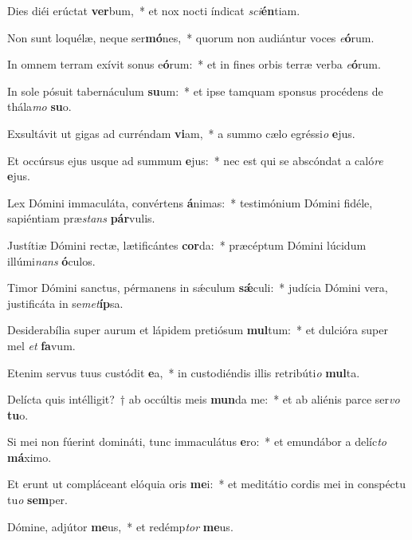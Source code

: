 \item Dies diéi erúctat \textbf{ver}bum,~* et nox nocti índicat \textit{sci}\textbf{én}tiam.
\item Non sunt loquélæ, neque ser\textbf{mó}nes,~* quorum non audiántur voces \textit{e}\textbf{ó}rum.
\item In omnem terram exívit sonus e\textbf{ó}rum:~* et in fines orbis terræ verba \textit{e}\textbf{ó}rum.
\item In sole pósuit tabernáculum \textbf{su}um:~* et ipse tamquam sponsus procédens de thála\textit{mo} \textbf{su}o.
\item Exsultávit ut gigas ad curréndam \textbf{vi}am,~* a summo cælo egréssi\textit{o} \textbf{e}jus.
\item Et occúrsus ejus usque ad summum \textbf{e}jus:~* nec est qui se abscóndat a caló\textit{re} \textbf{e}jus.
\item Lex Dómini immaculáta, convértens \textbf{á}nimas:~* testimónium Dómini fidéle, sapiéntiam præ\textit{stans} \textbf{pár}vulis.
\item Justítiæ Dómini rectæ, lætificántes \textbf{cor}da:~* præcéptum Dómini lúcidum illúmi\textit{nans} \textbf{ó}culos.
\item Timor Dómini sanctus, pérmanens in sǽculum \textbf{sǽ}culi:~* judícia Dómini vera, justificáta in se\textit{met}\textbf{íp}sa.
\item Desiderabília super aurum et lápidem pretiósum \textbf{mul}tum:~* et dulcióra super mel \textit{et} \textbf{fa}vum.
\item Etenim servus tuus custódit \textbf{e}a,~* in custodiéndis illis retribúti\textit{o} \textbf{mul}ta.
\item Delícta quis intélligit?~† ab occúltis meis \textbf{mun}da me:~* et ab aliénis parce ser\textit{vo} \textbf{tu}o.
\item Si mei non fúerint domináti, tunc immaculátus \textbf{e}ro:~* et emundábor a delíc\textit{to} \textbf{má}ximo.
\item Et erunt ut compláceant elóquia oris \textbf{me}i:~* et meditátio cordis mei in conspéctu tu\textit{o} \textbf{sem}per.
\item Dómine, adjútor \textbf{me}us,~* et redémp\textit{tor} \textbf{me}us.
